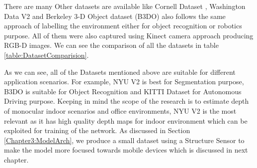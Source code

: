 There are many Other datasets are available like Cornell Dataset \cite{3Dscene} , Washington Data V2 \cite{Washington} and  Berkeley 3-D Object dataset (B3DO) \cite{Janoch:EECS-2012-85} also follows the same approach of labelling the environment either for object recognition or robotics purpose. All of them were also captured using Kinect camera approach producing RGB-D images. We can see the comparison of all the datasets in table \ref{table:DatasetComparision}.

As we can see, all of the Datasets mentioned above are suitable for different application scenarios. For example, NYU V2 \cite{Silberman:ECCV12} is best for Segmentation purpose, B3DO \cite{Janoch:EECS-2012-85} is suitable for Object Recognition and KITTI Dataset \cite{Geiger2013IJRR} for Autonomous Driving purpose. Keeping in mind the scope of the research is to estimate depth of monocular indoor scenarios and office environments, NYU V2 is the most relevant as it has high quality depth maps for indoor environment which can be exploited for training of the network. As discussed in Section \ref{Chapter3:ModelArch}, we produce a small dataset using a Structure Sensor to make the model more focused towards mobile devices which is discussed in next chapter.









